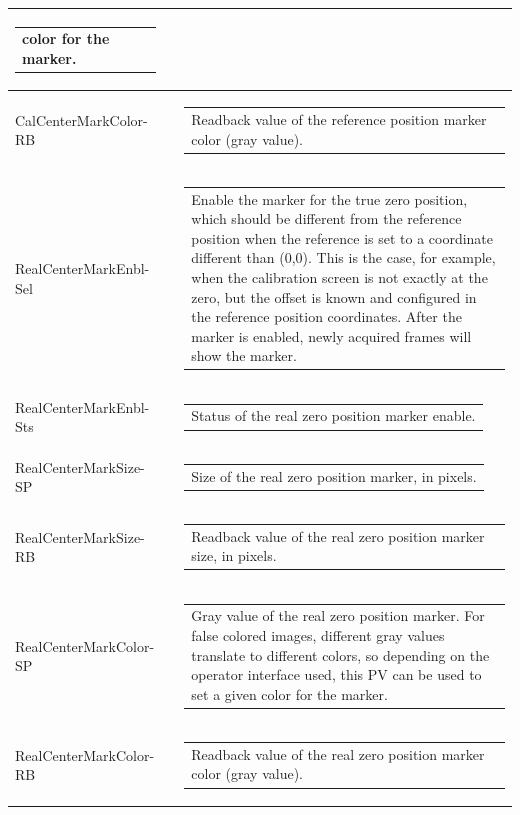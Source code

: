 \documentclass[openany]{article}
\begin{document}
\begin{longtable}{| m{3.0cm} m{4.5cm} m{7.0cm} |}
\begin{tabular}{@{}m{6cm}@{}}
                color for the marker.
            \end{tabular} \hypertarget{}{}\\ \hline
        CalCenterMarkColor-RB &  & \begin{tabular}{@{}m{6cm}@{}}
                Readback value of the reference position marker color (gray value).
            \end{tabular} \hypertarget{pv:real-center-mark-enbl}{}\\ \hline
        RealCenterMarkEnbl-Sel &  & \begin{tabular}{@{}m{6cm}@{}}
                Enable the marker for the true zero position, which should be different
                from the reference position when the reference is set to a coordinate
                different than (0,0). This is the case, for example, when the calibration
                screen is not exactly at the zero, but the offset is known and configured
                in the reference position coordinates. After the marker is enabled, newly
                acquired frames will show the marker.
            \end{tabular} \hypertarget{}{}\\ \hline
        RealCenterMarkEnbl-Sts &  & \begin{tabular}{@{}m{6cm}@{}}
                Status of the real zero position marker enable.
            \end{tabular} \hypertarget{pv:real-center-mark-size}{}\\ \hline
        RealCenterMarkSize-SP &  & \begin{tabular}{@{}m{6cm}@{}}
                Size of the real zero position marker, in pixels.
            \end{tabular} \hypertarget{}{}\\ \hline
        RealCenterMarkSize-RB &  & \begin{tabular}{@{}m{6cm}@{}}
		Readback value of the real zero position marker size, in pixels.
            \end{tabular} \hypertarget{pv:real-center-mark-color}{}\\ \hline
        RealCenterMarkColor-SP &  & \begin{tabular}{@{}m{6cm}@{}}
                Gray value of the real zero position marker. For false colored images,
                different gray values translate to different colors, so depending
                on the operator interface used, this PV can be used to set a given
                color for the marker.
            \end{tabular} \hypertarget{}{}\\ \hline
        RealCenterMarkColor-RB &  & \begin{tabular}{@{}m{6cm}@{}}
                Readback value of the real zero position marker color (gray value).
            \end{tabular} \hypertarget{}{}\\ \hline
    \end{longtable}
\end{document}

